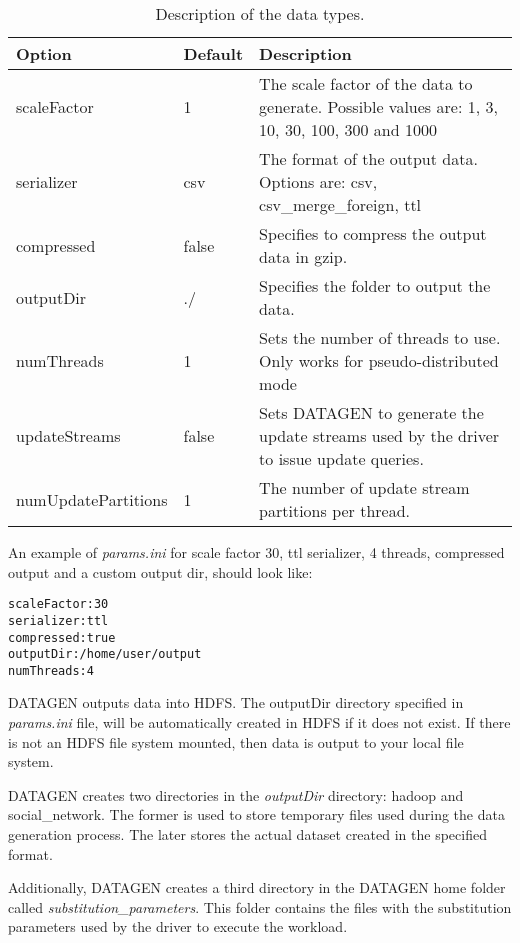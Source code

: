 \begin{table}[h]
\centering
\begin{tabular}{|p{2.5cm}|p{2.5cm}|p{10.5cm}|}
    \hline
    \textbf{Option} & \textbf{Default} & \textbf{Description} \\
    \hline
    scaleFactor & 1 & The scale factor of the data to generate. Possible values are: 1, 3, 10, 30, 100, 300 and 1000 \\
    \hline
    serializer & csv & The format of the output data. Options are: csv, csv\_merge\_foreign, ttl \\
    \hline
    compressed & false & Specifies to compress the output data in gzip. \\
    \hline
    outputDir & ./ & Specifies the folder to output the data. \\
    \hline
    numThreads & 1 & Sets the number of threads to use. Only works for pseudo-distributed mode \\
    \hline
    updateStreams & false & Sets DATAGEN to generate the update streams used by the driver to issue update queries. \\
    \hline
    numUpdatePartitions & 1 & The number of update stream partitions per thread. \\
    \hline
\end{tabular}
\caption{Description of the data types.}
\label{table:sndg_options}
\end{table}

An example of \textit{params.ini} for scale factor 30, ttl serializer, 4 threads,
compressed output and a custom output dir, should look like:

\begin{lstlisting}[backgroundcolor=\color{gray},frame=single]
scaleFactor:30
serializer:ttl
compressed:true
outputDir:/home/user/output
numThreads:4
\end{lstlisting}

DATAGEN outputs data into HDFS. The outputDir directory specified in
\textit{params.ini} file, will be automatically created in HDFS if it does not
exist. If there is not an HDFS file system mounted, then data is output to your
local file system. 

DATAGEN creates two directories in the \textit{outputDir} directory: hadoop and
social\_network.  The former is used to store temporary files used during the
data generation process. The later stores the actual dataset created in the
specified format.

Additionally, DATAGEN creates a third directory in the DATAGEN home folder
called \textit{substitution\_parameters}.  This folder contains the files with
the substitution parameters used by the driver to execute the workload.

